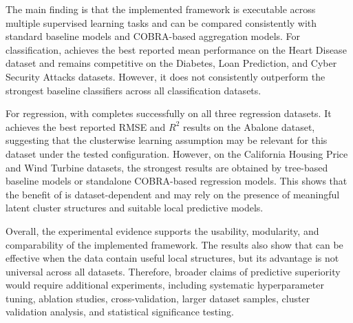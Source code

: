The main finding is that the implemented \KFCProcedure{} framework is executable across multiple supervised learning tasks and can be compared consistently with standard baseline models and COBRA-based aggregation models. For classification,  achieves the best reported mean performance on the Heart Disease dataset and remains competitive on the Diabetes, Loan Prediction, and Cyber Security Attacks datasets. However, it does not consistently outperform the strongest baseline classifiers across all classification datasets.

For regression,  with  completes successfully on all three regression datasets. It achieves the best reported RMSE and $R^2$ results on the Abalone dataset, suggesting that the clusterwise learning assumption may be relevant for this dataset under the tested configuration. However, on the California Housing Price and Wind Turbine datasets, the strongest results are obtained by tree-based baseline models or standalone COBRA-based regression models. This shows that the benefit of \KFCProcedure{} is dataset-dependent and may rely on the presence of meaningful latent cluster structures and suitable local predictive models.

Overall, the experimental evidence supports the usability, modularity, and comparability of the implemented framework. The results also show that \KFCProcedure{} can be effective when the data contain useful local structures, but its advantage is not universal across all datasets. Therefore, broader claims of predictive superiority would require additional experiments, including systematic hyperparameter tuning, ablation studies, cross-validation, larger dataset samples, cluster validation analysis, and statistical significance testing.


